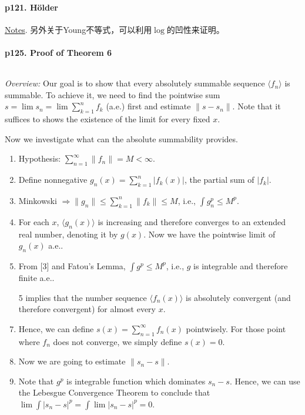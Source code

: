   \paragraph{p121. Hölder}
    \href{http://pi.math.cornell.edu/~erin/analysis/lectures.pdf}{Notes}.
    另外关于Young不等式，可以利用$\log$的凹性来证明。

  \paragraph{p125. Proof of Theorem 6}
    $\,$\par
    \textit{Overview:} Our goal is to show that every absolutely summable 
    sequence $\langle f_n\rangle$ is summable. To achieve it, we need to find
    the pointwise sum $s=\lim s_n = \lim\sum_{k=1}^n f_k$ (a.e.) first and
    estimate $\|s-s_n\|$. Note that it suffices to shows the existence of the 
    limit for every fixed $x$.\par
    Now we investigate what can the absolute summability provides. 
    \begin{enumerate}
      \item Hypothesis: $\sum_{n=1}^\infty\|f_n\|=M<\infty$.
      \item Define nonnegative $g_n(x)=\sum_{k=1}^n|f_k(x)|$, 
            the partial sum of $|f_k|$.
      \item Minkowski $\Rightarrow \|g_n\|\le\sum_{k=1}^n\|f_k\|\le M$, i.e.,
            $\int g_n^p \le M^p$. 
      \item For each $x$, $\langle g_n(x)\rangle$ is increasing and therefore 
            converges to an extended real number, denoting it by $g(x)$. Now we
            have the pointwise limit of $g_n(x)$ a.e..
      \item From [3] and Fatou's Lemma, $\int g^p \le M^p$, i.e., $g$ is 
            integrable and therefore finite a.e.. 
      \item [5] implies that the number sequence $\langle f_n(x)\rangle$ is 
            absolutely convergent (and therefore convergent) for almost every 
            $x$.
      \item Hence, we can define $s(x)=\sum_{n=1}^\infty f_n(x)$ pointwisely.
            For those point where $f_n$ does not converge, we simply define $s(x)
            =0$.
      \item Now we are going to estimate $\|s_n-s\|$.
      \item Note that $g^p$ is integrable function which dominates $s_n-s$. 
            Hence, we can use the Lebesgue Convergence Theorem to conclude that
            $\lim\int|s_n-s|^p = \int\lim|s_n-s|^p = 0$.
    \end{enumerate}

